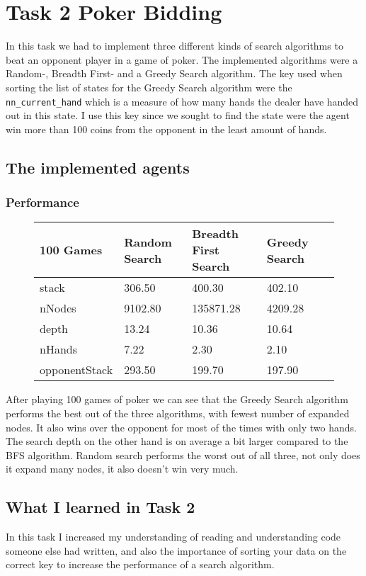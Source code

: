 \documentclass{article}
\begin{document}
\newpage
\section{Task 2 Poker Bidding}
In this task we had to implement three different kinds of search algorithms to beat
an opponent player in a game of poker. The implemented algorithms were a Random-, Breadth First-
and a Greedy Search algorithm. The key used when sorting the list of states for the Greedy Search algorithm
were the \texttt{nn\_current\_hand} which is a measure of how many hands the dealer have handed out in this state.
I use this key since we sought to find the state were the agent win more than 100 coins from the opponent in the least
amount of hands.
\subsection{The implemented agents}
\subsubsection{Performance}
\begin{figure}[H]
    \center
    \begin{tabular}{llllr}
        \toprule
        {100 Games} & {Random Search} & {Breadth First Search} & {Greedy Search}  \\
        \midrule
        stack         &   306.50 &     400.30 &   402.10 \\ 
        nNodes        &  9102.80 &  135871.28 &  4209.28 \\
        depth         &    13.24 &      10.36 &    10.64 \\
        nHands        &     7.22 &       2.30 &     2.10 \\
        opponentStack &   293.50 &     199.70 &   197.90 \\
        \bottomrule
    \end{tabular}
       
\end{figure}
After playing 100 games of poker we can see that the Greedy Search algorithm performs the best
out of the three algorithms, with fewest number of expanded nodes. It also wins over the opponent
for most of the times with only two hands. The search depth on the other hand is on average a bit
larger compared to the BFS algorithm. Random search performs the worst out of all three, not only
does it expand many nodes, it also doesn't win very much.

\subsection{What I learned in Task 2}
In this task I increased my understanding of reading and understanding code someone else had written,
and also the importance of sorting your data on the correct key to increase the performance of a search algorithm.
\end{document}
